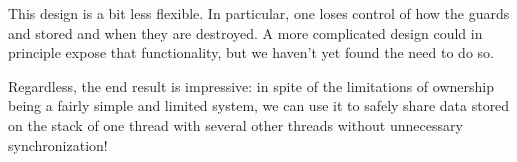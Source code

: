 This design is a bit less flexible. In particular, one loses control of how
the guards and stored and when they are destroyed. A more complicated design
could in principle expose that functionality, but we haven't yet found the need
to do so.

Regardless, the end result is impressive: in spite of the limitations of ownership
being a fairly simple and limited system, we can use it to safely share data stored
on the stack of one thread with several other threads without unnecessary
synchronization!

